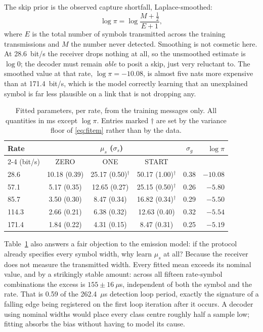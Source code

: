 The skip prior is the observed capture shortfall, Laplace-smoothed:
\begin{equation}
\log\pi = \log\frac{M + \tfrac{1}{2}}{E + 1},
\label{eq:fitskip}
\end{equation}
where $E$ is the total number of symbols transmitted across the training
transmissions and $M$ the number never detected. Smoothing is not cosmetic
here. At 28.6~bit/s the receiver drops nothing at all, so the unsmoothed
estimate is $\log 0$; the decoder must remain \emph{able} to posit a skip, just
very reluctant to. The smoothed value at that rate, $\log\pi = -10.08$, is
almost five nats more expensive than at 171.4~bit/s, which is the model
correctly learning that an unexplained symbol is far less plausible on a link
that is not dropping any.

\begin{table}[t]
\caption{Fitted parameters, per rate, from the training messages only. All
quantities in ms except $\log\pi$. Entries marked $\dagger$ are set by the
variance floor of \eqref{eq:fitem} rather than by the data.}
\label{tab:params}
\centering
\small
\setlength{\tabcolsep}{3.5pt}
\begin{tabular}{@{}lccccr@{}}
\toprule
Rate & \multicolumn{3}{c}{$\mu_s$ ($\sigma_s$)} & $\sigma_g$ & $\log\pi$ \\
\cmidrule(lr){2-4}
(bit/s) & ZERO & ONE & START & & \\
\midrule
28.6  & 10.18 (0.39) & 25.17 (0.50)$^\dagger$ & 50.17 (1.00)$^\dagger$ & 0.38 & $-10.08$ \\
57.1  & 5.17 (0.35)  & 12.65 (0.27)           & 25.15 (0.50)$^\dagger$ & 0.26 & $-5.80$ \\
85.7  & 3.50 (0.30)  & 8.47 (0.34)            & 16.82 (0.34)$^\dagger$ & 0.29 & $-5.50$ \\
114.3 & 2.66 (0.21)  & 6.38 (0.32)            & 12.63 (0.40)           & 0.32 & $-5.54$ \\
171.4 & 1.84 (0.22)  & 4.31 (0.15)            & 8.47 (0.31)            & 0.25 & $-5.19$ \\
\bottomrule
\end{tabular}
\end{table}

Table~\ref{tab:params} also answers a fair objection to the emission model:
if the protocol already specifies every symbol width, why learn $\mu_s$ at all?
Because the receiver does not measure the transmitted width. Every fitted mean
exceeds its nominal value, and by a strikingly stable amount: across all
fifteen rate-symbol combinations the excess is $155 \pm 16~\mu$s, independent of
both the symbol and the rate. That is 0.59 of the 262.4~$\mu$s detection loop
period, exactly the signature of a falling edge being registered on the first
loop iteration after it occurs. A decoder using nominal widths would place
every class centre roughly half a sample low; fitting absorbs the bias without
having to model its cause.

